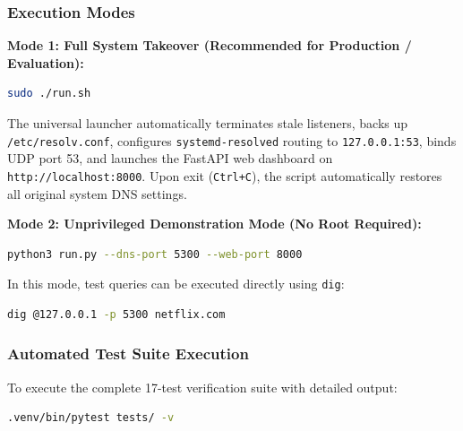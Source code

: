 \documentclass[10pt,a4paper]{article}
\begin{document}
\subsubsection{Execution Modes}
\textbf{Mode 1: Full System Takeover (Recommended for Production / Evaluation):}
\begin{lstlisting}[language=bash, caption={Launching cipherDNS with Privileged Port 53 Takeover}]
sudo ./run.sh
\end{lstlisting}
The universal launcher automatically terminates stale listeners, backs up \texttt{/etc/resolv.conf}, configures \texttt{systemd-resolved} routing to \texttt{127.0.0.1:53}, binds UDP port 53, and launches the FastAPI web dashboard on \texttt{http://localhost:8000}. Upon exit (\texttt{Ctrl+C}), the script automatically restores all original system DNS settings.

\noindent\textbf{Mode 2: Unprivileged Demonstration Mode (No Root Required):}
\begin{lstlisting}[language=bash, caption={Launching cipherDNS on Unprivileged Port 5300}]
python3 run.py --dns-port 5300 --web-port 8000
\end{lstlisting}
In this mode, test queries can be executed directly using \texttt{dig}:
\begin{lstlisting}[language=bash]
dig @127.0.0.1 -p 5300 netflix.com
\end{lstlisting}

\subsubsection{Automated Test Suite Execution}
To execute the complete 17-test verification suite with detailed output:
\begin{lstlisting}[language=bash]
.venv/bin/pytest tests/ -v
\end{lstlisting}
\end{document}
